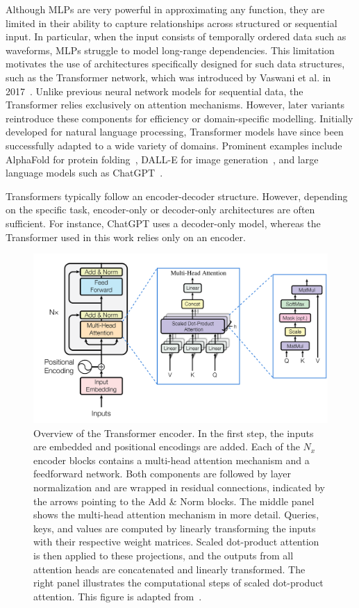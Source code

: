 Although MLPs are very powerful in approximating any function, they are limited in their ability to capture relationships across structured or sequential input. In particular, when the input consists of temporally ordered data such as waveforms, MLPs struggle to model long-range dependencies. This limitation motivates the use of architectures specifically designed for such data structures, such as the Transformer network, which was introduced by Vaswani et al. in 2017~\cite{vaswani_attention_2023}. Unlike previous neural network models for sequential data, the Transformer relies exclusively on attention mechanisms. However, later variants reintroduce these components for efficiency or domain-specific modelling. 
Initially developed for natural language processing, Transformer models have since been successfully adapted to a wide variety of domains. Prominent examples include AlphaFold for protein folding~\cite{madani_large_2023}, DALL-E for image generation~\cite{parmar_image_2018}, and large language models such as ChatGPT~\cite{openai_gpt-4_2024}. 

Transformers typically follow an encoder-decoder structure. However, depending on the specific task, encoder-only or decoder-only architectures are often sufficient. For instance, ChatGPT uses a decoder-only model, whereas the Transformer used in this work relies only on an encoder. 


\begin{figure}
    \centering
    \includegraphics[width=0.95\linewidth]{figures/04_transformer/Transformer_overview.png}
    \caption{Overview of the Transformer encoder. In the first step, the inputs are embedded and positional encodings are added. Each of the $N_x$ encoder blocks contains a multi-head attention mechanism and a feedforward network. Both components are followed by layer normalization and are wrapped in residual connections, indicated by the arrows pointing to the Add \& Norm blocks. The middle panel shows the multi-head attention mechanism in more detail. Queries, keys, and values are computed by linearly transforming the inputs with their respective weight matrices. Scaled dot-product attention is then applied to these projections, and the outputs from all attention heads are concatenated and linearly transformed. The right panel illustrates the computational steps of scaled dot-product attention. This figure is adapted from~\cite{vaswani_attention_2023}.}
\label{fig:transformer_encoder}
\end{figure}

